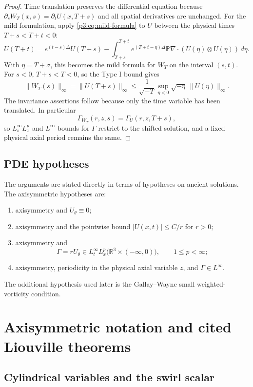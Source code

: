 \documentclass[11pt]{amsart}
\theoremstyle{plain}
\theoremstyle{definition}
\theoremstyle{remark}
\numberwithin{equation}{section}
\begin{document}
\begin{proof}
Time translation preserves the differential equation because
\(\partial_sW_T(x,s)=\partial_tU(x,T+s)\) and all spatial derivatives are
unchanged.  For the mild formulation, apply \eqref{p3:eq:mild-formula} to \(U\)
between the physical times \(T+s<T+t<0\):
\[
   U(T+t)=e^{(t-s)\Delta}U(T+s)
   -\int_{T+s}^{T+t}e^{(T+t-\eta)\Delta}\mathbb P\nabla\cdot
      (U(\eta)\otimes U(\eta))\,d\eta .
\]
With \(\eta=T+\sigma\), this becomes the mild formula for \(W_T\) on the
interval \((s,t)\).  For \(s<0\), \(T+s<T<0\), so the Type I bound gives
\[
   \|W_T(s)\|_\infty
   =
   \|U(T+s)\|_\infty
   \le
   \frac1{\sqrt{-T}}
   \sup_{\eta<0}\sqrt{-\eta}\,\|U(\eta)\|_\infty .
\]
The invariance assertions follow because only the time variable has been
translated.  In particular
\[
   \Gamma_{W_T}(r,z,s)=\Gamma_U(r,z,T+s),
\]
so \(L_s^\infty L_x^p\) and \(L^\infty\) bounds for \(\Gamma\) restrict to the
shifted solution, and a fixed physical axial period remains the same.
\end{proof}

\subsection{PDE hypotheses}

The arguments are stated directly in terms of hypotheses on ancient
solutions.  The axisymmetric hypotheses are:
\begin{enumerate}[label=\textup{(\roman*)}]
\item axisymmetry and \(U_\theta\equiv0\);
\item axisymmetry and the pointwise bound \(|U(x,t)|\le C/r\) for \(r>0\);
\item axisymmetry and
\[
   \Gamma=rU_\theta\in L_t^\infty L_x^p
   \bigl(\mathbb R^3\times(-\infty,0)\bigr),
   \qquad 1\le p<\infty;
\]
\item axisymmetry, periodicity in the physical axial variable \(z\), and
\(\Gamma\in L^\infty\).
\end{enumerate}
The additional hypothesis used later is the Gallay--Wayne small
weighted-vorticity condition.

\section{Axisymmetric notation and cited Liouville theorems}
\label{p3:sec:axisymmetric-liouville-theorems}

\subsection{Cylindrical variables and the swirl scalar}
\end{document}
